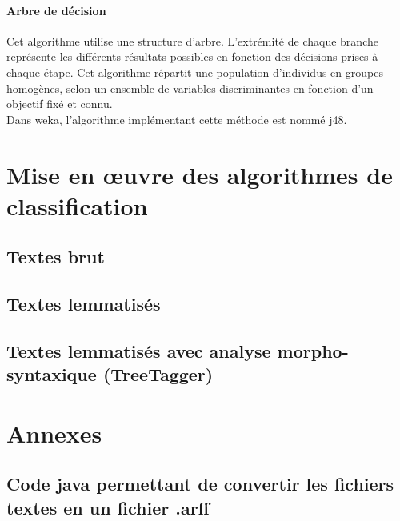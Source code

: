 \documentclass[a4paper,11pt]{article}
\begin{document}
\paragraph{Arbre de décision}
Cet algorithme utilise une structure d’arbre. L’extrémité de chaque branche représente les différents résultats possibles en fonction des décisions prises à chaque étape. Cet algorithme répartit une population d’individus en groupes homogènes, selon un ensemble de variables discriminantes en fonction d’un objectif fixé et connu.\\Dans weka, l’algorithme implémentant cette méthode est nommé j48.

\newpage
\section{Mise en œuvre des algorithmes de classification}
\subsection{Textes brut}
\subsection{Textes lemmatisés}
\subsection{Textes lemmatisés avec analyse morpho-syntaxique (TreeTagger)}


\newpage
\section*{Annexes}
\subsection*{Code java permettant de convertir les fichiers textes en un fichier .arff}
\end{document}
